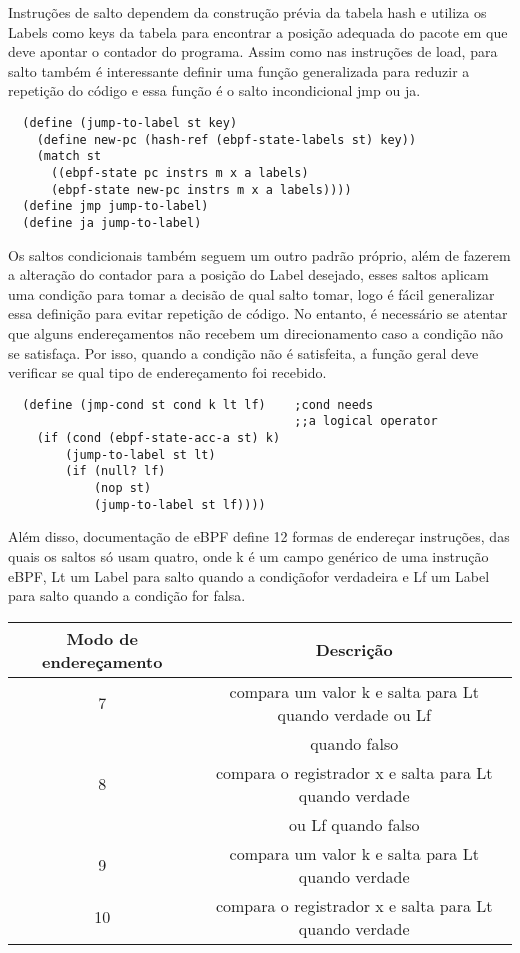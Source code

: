 \documentclass[paper=a4, fontsize=12pt]{article}
\theoremstyle{definition}
\begin{document}
Instruções de salto dependem da construção prévia da tabela hash e utiliza os Labels como keys da tabela
para encontrar a posição adequada do pacote em que deve apontar o contador do programa. Assim como nas
instruções de load, para salto também é interessante definir uma função generalizada para reduzir a repetição
do código e essa função é o salto incondicional jmp ou ja.

\begin{lstlisting}
  (define (jump-to-label st key)
    (define new-pc (hash-ref (ebpf-state-labels st) key))
    (match st
      ((ebpf-state pc instrs m x a labels)
      (ebpf-state new-pc instrs m x a labels))))
  (define jmp jump-to-label)
  (define ja jump-to-label)
\end{lstlisting}

Os saltos condicionais também seguem um outro padrão próprio, além de fazerem a alteração do contador para
a posição do Label desejado, esses saltos aplicam uma condição para tomar a decisão de qual salto tomar, logo
é fácil generalizar essa definição para evitar repetição de código. No entanto, é necessário se atentar que
alguns endereçamentos não recebem um direcionamento caso a condição não se satisfaça. Por isso, quando a condição
não é satisfeita, a função geral deve verificar se qual tipo de endereçamento foi recebido.

\begin{lstlisting}
  (define (jmp-cond st cond k lt lf)    ;cond needs 
                                        ;;a logical operator 
    (if (cond (ebpf-state-acc-a st) k)
        (jump-to-label st lt)
        (if (null? lf)
            (nop st)
            (jump-to-label st lf))))
\end{lstlisting}

Além disso, documentação de eBPF define 12 formas de endereçar instruções, das quais os saltos
só usam quatro, onde k é um campo genérico de uma instrução eBPF, Lt um Label para salto quando a condiçãofor verdadeira
e Lf um Label para salto quando a condição for falsa.  

\begin{center}
\begin{tabular}{ |c|c| }
  \hline
  Modo de endereçamento & Descrição\\
  \hline
  7 & compara um valor k e salta para Lt quando verdade ou Lf\\
  & quando falso\\
  \hline
  8 & compara o registrador x e salta para Lt quando verdade\\ 
  & ou Lf quando falso\\
  \hline
  9 & compara um valor k e salta para Lt quando verdade\\
  \hline
  10 & compara o registrador x e salta para Lt quando verdade\\
  \hline
\end{tabular}
\end{center}
\end{document}
